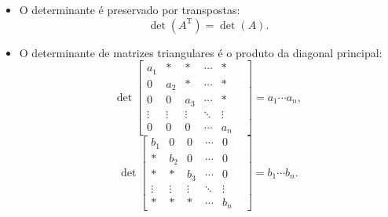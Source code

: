 \begin{itemize}
	\item O determinante é preservado por transpostas:
	\[\det(A^\mathrm{T})=\det(A).\]
	
	\item O determinante de matrizes triangulares é o produto da diagonal principal:
	\[\det\begin{bmatrix}a_1&*&*&\cdots&*\\
	0&a_2&*&\cdots&*\\
	0&0&a_3&\cdots&*\\
	\vdots&\vdots&\vdots&\ddots&\vdots&\\
	0&0&0&\cdots&a_n\end{bmatrix}=a_1\cdots a_n,\]
	\[\det\begin{bmatrix}b_1&0&0&\cdots&0\\
	*&b_2&0&\cdots&0\\
	*&*&b_3&\cdots&0\\
	\vdots&\vdots&\vdots&\ddots&\vdots&\\
	*&*&*&\cdots&b_n\end{bmatrix}=b_1\cdots b_n.\]
\end{itemize}